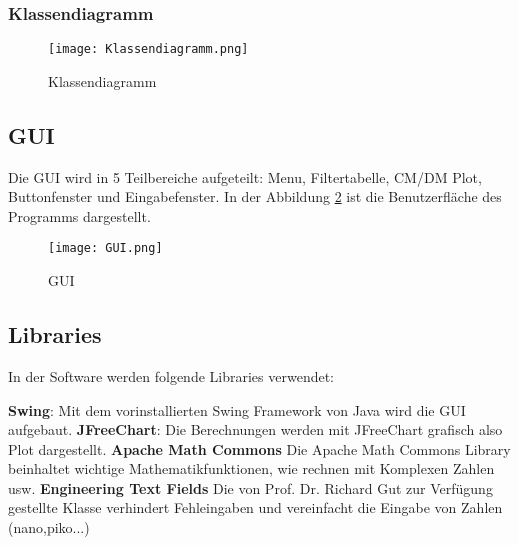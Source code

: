 \newpage

\subsubsection{Klassendiagramm} \label{subsubsec:Klassendiagramm}

\begin{figure}[H]
	\centering
	\texttt{[image: Klassendiagramm.png]}
	\caption{Klassendiagramm}
	\label{fig:Klassendiagramm}
\end{figure} 

\newpage

\subsection{GUI} \label{subsec:GUI}

Die GUI wird in 5 Teilbereiche aufgeteilt: Menu, Filtertabelle, CM/DM Plot, Buttonfenster und Eingabefenster. In der Abbildung \ref{fig:GUI}  ist die Benutzerfläche des Programms dargestellt.

\begin{figure}[H]
	\centering
	\texttt{[image: GUI.png]}
	\caption{GUI}
	\label{fig:GUI}
\end{figure}



\subsection{Libraries} \label{subsec:Libraries}

In der Software werden folgende Libraries verwendet:

\textbf{Swing}: Mit dem vorinstallierten Swing Framework von Java wird die GUI aufgebaut.
\textbf{JFreeChart}: Die Berechnungen werden mit JFreeChart grafisch also Plot dargestellt. \cite{jfreechart}
\textbf{Apache Math Commons} Die Apache Math Commons Library beinhaltet wichtige Mathematikfunktionen, wie rechnen mit Komplexen Zahlen usw. \cite{apache}
\textbf{Engineering Text Fields} Die von Prof. Dr. Richard Gut zur Verfügung gestellte Klasse verhindert Fehleingaben und vereinfacht die Eingabe von Zahlen (nano,piko...)

\newpage
